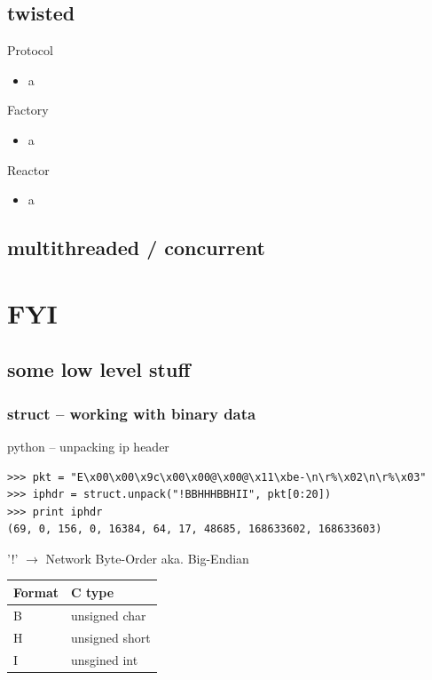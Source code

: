 \documentclass{beamer}
\begin{document}
\subsection*{twisted}	%
\begin{frame}
	\begin{block}{Protocol}
	\begin{itemize}
		\item a
	\end{itemize}
	\end{block}

	\begin{block}{Factory}
	\begin{itemize}
		\item a
	\end{itemize}
	\end{block}

	\begin{block}{Reactor}
	\begin{itemize}
		\item a
	\end{itemize}
	\end{block}
\end{frame}

\subsection*{multithreaded / concurrent}	%


\section{FYI}

\subsection*{some low level stuff}	%

\begin{frame}[fragile]
	\frametitle{struct -- working with binary data}
	\begin{exampleblock}{python -- unpacking ip header}
	\begin{lstlisting}
>>> pkt = "E\x00\x00\x9c\x00\x00@\x00@\x11\xbe-\n\r%\x02\n\r%\x03"
>>> iphdr = struct.unpack("!BBHHHBBHII", pkt[0:20])
>>> print iphdr
(69, 0, 156, 0, 16384, 64, 17, 48685, 168633602, 168633603)
	\end{lstlisting}
	\end{exampleblock}
	'!' $\rightarrow$ Network Byte-Order aka. Big-Endian\\[0.4cm]
	\begin{tabular}{|l|l|}	
	Format & C type\\
	\hline
	B & unsigned char\\
	H & unsigned short\\
	I & unsgined int\\	
	\end{tabular}
\end{frame}
\end{document}
